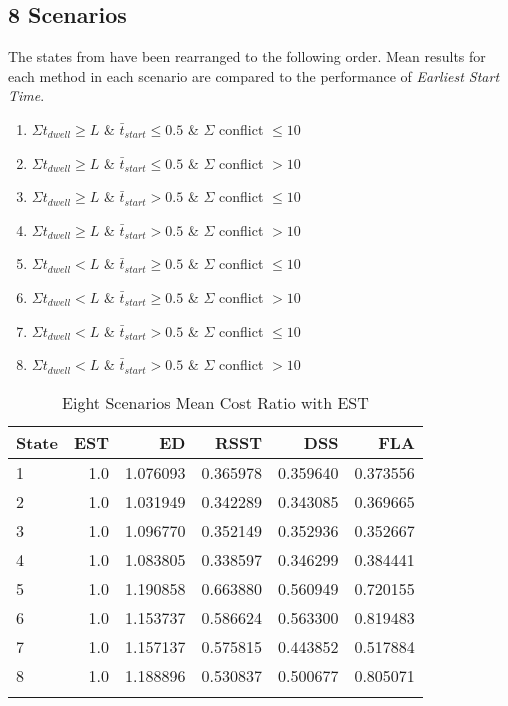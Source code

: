 \documentclass[journal,12pt,onecolumn,draftclsnofoot,]{IEEEtran}
\begin{document}
\subsection{8 Scenarios}

The states from \cite{modified_q_learn} have been rearranged to the following order.
Mean results for each method in each scenario are compared to the performance of \emph{Earliest Start Time}.

\begin{enumerate}
	\item $ \Sigma t_{dwell} \ge L $ \& $ \bar{t}_{start} \le 0.5 $ \& $ \Sigma $ conflict $ \le 10$
	\item $ \Sigma t_{dwell} \ge L $ \& $ \bar{t}_{start} \le 0.5 $ \& $ \Sigma $ conflict $ > 10$
	\item $ \Sigma t_{dwell} \ge L $ \& $ \bar{t}_{start} > 0.5 $ \& $ \Sigma $ conflict $ \le 10$
	\item $ \Sigma t_{dwell} \ge L $ \& $ \bar{t}_{start} > 0.5 $ \& $ \Sigma $ conflict $ > 10$
	\item $ \Sigma t_{dwell} < L $ \& $ \bar{t}_{start} \ge 0.5 $ \& $ \Sigma $ conflict $ \le 10$
	\item $ \Sigma t_{dwell} < L $ \& $ \bar{t}_{start} \ge 0.5 $ \& $ \Sigma $ conflict $ > 10$
	\item $ \Sigma t_{dwell} < L $ \& $ \bar{t}_{start} > 0.5 $ \& $ \Sigma $ conflict $ \le 10$
	\item $ \Sigma t_{dwell} < L $ \& $ \bar{t}_{start} > 0.5 $ \& $ \Sigma $ conflict $ > 10$
\end{enumerate}

\begin{table}[h]
	\begin{tabular}{lrrrrr}
		\hline
		\textbf{State} & \textbf{EST} & \textbf{ED} & \textbf{RSST} & \textbf{DSS} & \textbf{FLA} \\\hline
		1              & 1.0          & 1.076093    & 0.365978      & 0.359640     & 0.373556     \\
		2              & 1.0          & 1.031949    & 0.342289      & 0.343085     & 0.369665     \\
		3              & 1.0          & 1.096770    & 0.352149      & 0.352936     & 0.352667     \\
		4              & 1.0          & 1.083805    & 0.338597      & 0.346299     & 0.384441     \\
		5              & 1.0          & 1.190858    & 0.663880      & 0.560949     & 0.720155     \\
		6              & 1.0          & 1.153737    & 0.586624      & 0.563300     & 0.819483     \\
		7              & 1.0          & 1.157137    & 0.575815      & 0.443852     & 0.517884     \\
		8              & 1.0          & 1.188896    & 0.530837      & 0.500677     & 0.805071     \\ \hline
		\\
	\end{tabular}
	\caption{Eight Scenarios Mean Cost Ratio with EST}
	\label{tab:eight}
\end{table}
\end{document}
